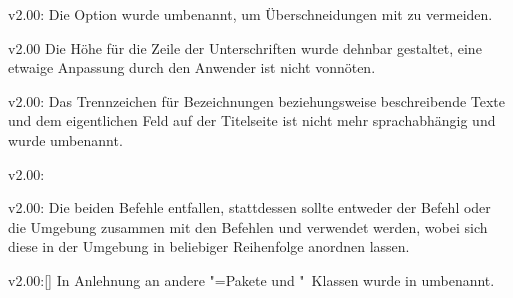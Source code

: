 \begin{Obsolete}{v2.00:}{}
\printobsoletelist%
%
Die Option wurde umbenannt, um Überschneidungen mit  zu 
vermeiden.
\end{Obsolete}

\begin{Obsolete}{v2.00}{}
\printobsoletelist%
%
Die Höhe für die Zeile der Unterschriften wurde dehnbar gestaltet, eine etwaige 
Anpassung durch den Anwender ist nicht vonnöten.
\end{Obsolete}

\begin{Obsolete}{v2.00:}{}%
\printobsoletelist%
%
Das Trennzeichen für Bezeichnungen beziehungsweise beschreibende Texte und dem 
eigentlichen Feld auf der Titelseite ist nicht mehr sprachabhängig und wurde 
umbenannt.
\end{Obsolete}

\begin{Obsolete}{v2.00:}{}
\begin{Obsolete}{v2.00:}{}
\printobsoletelist%
%
Die beiden Befehle entfallen, stattdessen sollte entweder der Befehl 
 oder die Umgebung  zusammen mit 
den Befehlen  und  verwendet werden, 
wobei sich diese in der Umgebung in beliebiger Reihenfolge anordnen lassen.
\end{Obsolete}
\end{Obsolete}

\begin{Obsolete}{v2.00:}{[]}
\printobsoletelist%
%
In Anlehnung an andere "=Pakete und "~Klassen wurde 
 in  umbenannt.
\end{Obsolete}

